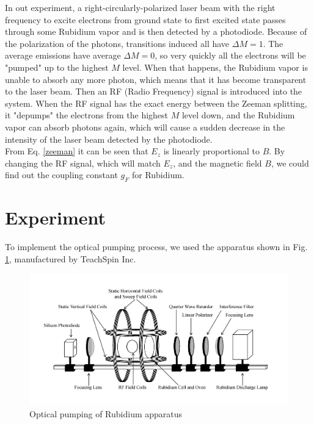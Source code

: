 \documentclass[prb,preprint]{revtex4-1}
\begin{document}
In out experiment, a right-circularly-polarized laser beam with the right frequency to excite electrons from ground state to first excited state passes through some Rubidium vapor and is then detected by a photodiode. Because of the polarization of the photons, transitions induced all have $\Delta M=1$. The average emissions have average $\Delta M=0$, so very quickly all the electrons will be "pumped" up to the highest $M$ level. When that happens, the Rubidium vapor is unable to absorb any more photon, which means that it has become transparent to the laser beam. Then an RF (Radio Frequency) signal is introduced into the system. When the RF signal has the exact energy between the Zeeman splitting, it "depumps" the electrons from the highest $M$ level down, and the Rubidium vapor can absorb photons again, which will cause a sudden decrease in the intensity of the laser beam detected by the photodiode. \\

From Eq. \eqref{zeeman} it can be seen that $E_{z}$ is linearly proportional to $B$. By changing the RF signal, which will match $E_{z}$, and the magnetic field $B$, we could find out the coupling constant $g_{F}$ for Rubidium.\\

\section{Experiment}

To implement the optical pumping process, we used the apparatus shown in Fig. 
\ref{exp}, manufactured by TeachSpin Inc. \\

\begin{figure}[h]
\centering
\includegraphics[width=16cm]{exp.jpg}
\caption{Optical pumping of Rubidium apparatus}
\label{exp}
\end{figure}
\end{document}
